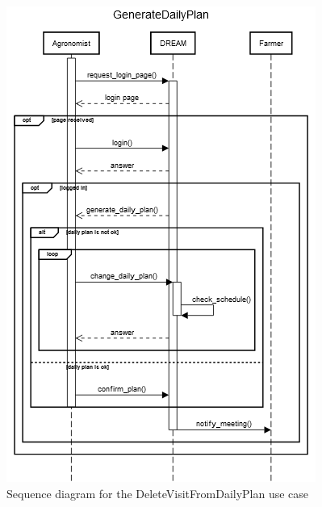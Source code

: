\documentclass{article}
\begin{document}
\begin{figure}[H]
    \centering
    \includegraphics[scale=0.75]{sequence_diagrams/GenerateDailyPlan}
    \caption{Sequence diagram for the DeleteVisitFromDailyPlan use case}
\end{figure}

\end{document}
